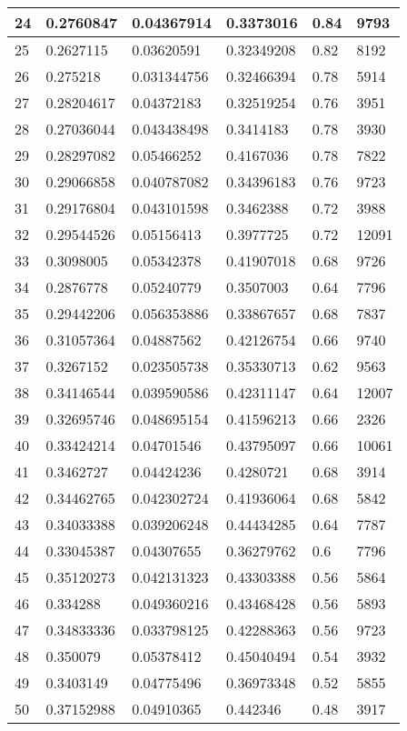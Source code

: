 \begin{longtable}{|l|l|l|l|l|l|}
24 & 0.2760847 & 0.04367914 & 0.3373016 & 0.84 & 9793 \\ \hline 
25 & 0.2627115 & 0.03620591 & 0.32349208 & 0.82 & 8192 \\ \hline 
26 & 0.275218 & 0.031344756 & 0.32466394 & 0.78 & 5914 \\ \hline 
27 & 0.28204617 & 0.04372183 & 0.32519254 & 0.76 & 3951 \\ \hline 
28 & 0.27036044 & 0.043438498 & 0.3414183 & 0.78 & 3930 \\ \hline 
29 & 0.28297082 & 0.05466252 & 0.4167036 & 0.78 & 7822 \\ \hline 
30 & 0.29066858 & 0.040787082 & 0.34396183 & 0.76 & 9723 \\ \hline 
31 & 0.29176804 & 0.043101598 & 0.3462388 & 0.72 & 3988 \\ \hline 
32 & 0.29544526 & 0.05156413 & 0.3977725 & 0.72 & 12091 \\ \hline 
33 & 0.3098005 & 0.05342378 & 0.41907018 & 0.68 & 9726 \\ \hline 
34 & 0.2876778 & 0.05240779 & 0.3507003 & 0.64 & 7796 \\ \hline 
35 & 0.29442206 & 0.056353886 & 0.33867657 & 0.68 & 7837 \\ \hline 
36 & 0.31057364 & 0.04887562 & 0.42126754 & 0.66 & 9740 \\ \hline 
37 & 0.3267152 & 0.023505738 & 0.35330713 & 0.62 & 9563 \\ \hline 
38 & 0.34146544 & 0.039590586 & 0.42311147 & 0.64 & 12007 \\ \hline 
39 & 0.32695746 & 0.048695154 & 0.41596213 & 0.66 & 2326 \\ \hline 
40 & 0.33424214 & 0.04701546 & 0.43795097 & 0.66 & 10061 \\ \hline 
41 & 0.3462727 & 0.04424236 & 0.4280721 & 0.68 & 3914 \\ \hline 
42 & 0.34462765 & 0.042302724 & 0.41936064 & 0.68 & 5842 \\ \hline 
43 & 0.34033388 & 0.039206248 & 0.44434285 & 0.64 & 7787 \\ \hline 
44 & 0.33045387 & 0.04307655 & 0.36279762 & 0.6 & 7796 \\ \hline 
45 & 0.35120273 & 0.042131323 & 0.43303388 & 0.56 & 5864 \\ \hline 
46 & 0.334288 & 0.049360216 & 0.43468428 & 0.56 & 5893 \\ \hline 
47 & 0.34833336 & 0.033798125 & 0.42288363 & 0.56 & 9723 \\ \hline 
48 & 0.350079 & 0.05378412 & 0.45040494 & 0.54 & 3932 \\ \hline 
49 & 0.3403149 & 0.04775496 & 0.36973348 & 0.52 & 5855 \\ \hline 
50 & 0.37152988 & 0.04910365 & 0.442346 & 0.48 & 3917 \\ \hline 
\end{longtable}